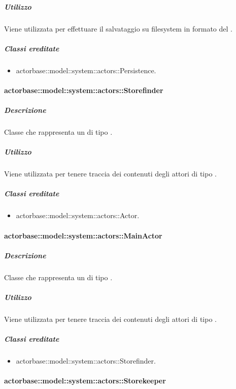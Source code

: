 \documentclass{scalatekids-article}
\begin{document}
\subparagraph{Utilizzo}

Viene utilizzata per effettuare il salvataggio su filesystem in formato
 del .

\subparagraph{Classi ereditate}

\begin{itemize}
\item actorbase::model::system::actors::Persistence.
\end{itemize}

\paragraph{actorbase::model::system::actors::Storefinder}

\subparagraph{Descrizione}

Classe che rappresenta un  di tipo .

\subparagraph{Utilizzo}

Viene utilizzata per tenere traccia dei contenuti degli attori di tipo
.

\subparagraph{Classi ereditate}

\begin{itemize}
\item actorbase::model::system::actors::Actor.
\end{itemize}

\paragraph{actorbase::model::system::actors::MainActor}

\subparagraph{Descrizione}

Classe che rappresenta un  di tipo .

\subparagraph{Utilizzo}

Viene utilizzata per tenere traccia dei contenuti degli attori di tipo
.

\subparagraph{Classi ereditate}

\begin{itemize}
\item actorbase::model::system::actors::Storefinder.
\end{itemize}

\paragraph{actorbase::model::system::actors::Storekeeper}
\end{document}
